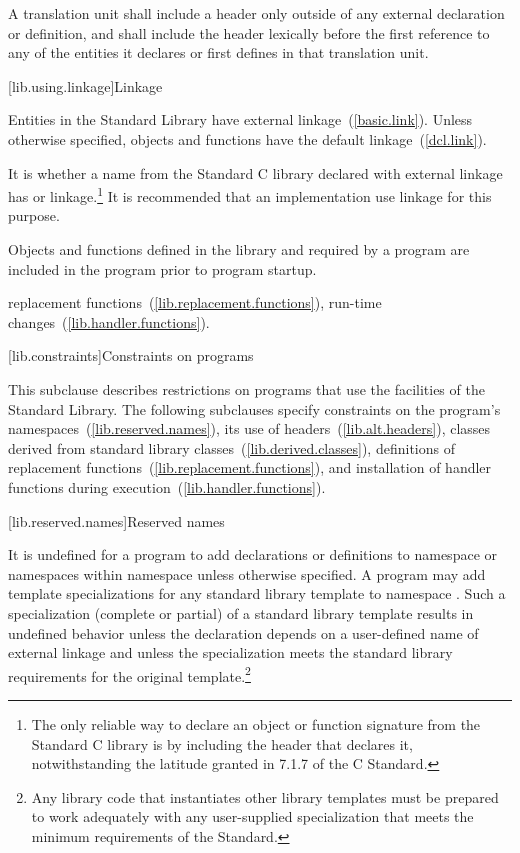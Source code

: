 \pnum
A translation unit shall include a header only outside of any
%
external declaration or definition, and shall include the header lexically
before the first reference to any of the entities it declares or first
defines in that translation unit.

[lib.using.linkage]{Linkage}

\pnum
Entities in the \Cpp Standard Library have external linkage~(\ref{basic.link}).
Unless otherwise specified, objects and functions have the default
linkage~(\ref{dcl.link}).

\pnum
{}%
It is  whether a name
from the Standard C library declared with
external linkage has
%
%
%
or
%
linkage.\footnote{The only reliable way to declare an object or
function signature from the Standard C library is by including the header that
declares it, notwithstanding the latitude granted in 7.1.7 of the C
Standard.} It is recommended that an
implementation use
linkage for this purpose.

\pnum
Objects and functions
defined in the library and required by a \Cpp program are included in
the program prior to program startup.

%
\xref
replacement functions~(\ref{lib.replacement.functions}),
run-time changes~(\ref{lib.handler.functions}).

[lib.constraints]{Constraints on programs}

\pnum
This subclause describes restrictions on \Cpp programs that use the facilities of
the \Cpp Standard Library. The following subclauses specify constraints on the
program's namespaces~(\ref{lib.reserved.names}), its use of
headers~(\ref{lib.alt.headers}), classes derived from standard library
classes~(\ref{lib.derived.classes}), definitions of replacement
functions~(\ref{lib.replacement.functions}), and installation of handler
functions during execution~(\ref{lib.handler.functions}).

[lib.reserved.names]{Reserved names}%

\pnum
It is undefined for a \Cpp program to add declarations or definitions to
namespace  or namespaces within namespace  unless
otherwise specified. A program may add template specializations for any
standard library template to namespace . Such a specialization
(complete or partial) of a standard library template results in undefined
behavior unless the declaration depends on a user-defined name of external
linkage and unless the specialization meets the standard library requirements
for the original template.\footnote{Any library code that instantiates other
library templates must be prepared to work adequately with any user-supplied
specialization that meets the minimum requirements of the Standard.}

